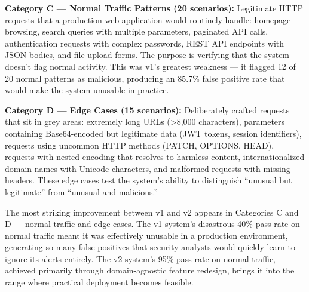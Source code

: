 \documentclass[journal,onecolumn]{IEEEtran}
\begin{document}
\textbf{Category C --- Normal Traffic Patterns (20 scenarios):} Legitimate HTTP requests that a production web application would routinely handle: homepage browsing, search queries with multiple parameters, paginated API calls, authentication requests with complex passwords, REST API endpoints with JSON bodies, and file upload forms. The purpose is verifying that the system doesn't flag normal activity. This was v1's greatest weakness --- it flagged 12 of 20 normal patterns as malicious, producing an 85.7\% false positive rate that would make the system unusable in practice.

\textbf{Category D --- Edge Cases (15 scenarios):} Deliberately crafted requests that sit in grey areas: extremely long URLs (>8,000 characters), parameters containing Base64-encoded but legitimate data (JWT tokens, session identifiers), requests using uncommon HTTP methods (PATCH, OPTIONS, HEAD), requests with nested encoding that resolves to harmless content, internationalized domain names with Unicode characters, and malformed requests with missing headers. These edge cases test the system's ability to distinguish ``unusual but legitimate'' from ``unusual and malicious.''

\begin{table}[h]
\centering
\caption{Behavioural Test Suite Results Summary}
\label{tab:behavioural_test}
\end{table}

The most striking improvement between v1 and v2 appears in Categories C and D --- normal traffic and edge cases. The v1 system's disastrous 40\% pass rate on normal traffic meant it was effectively unusable in a production environment, generating so many false positives that security analysts would quickly learn to ignore its alerts entirely. The v2 system's 95\% pass rate on normal traffic, achieved primarily through domain-agnostic feature redesign, brings it into the range where practical deployment becomes feasible.
\end{document}
